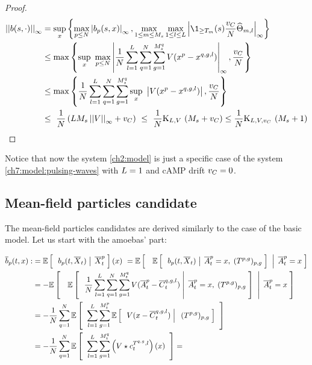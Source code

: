 \begin{proof}
	\begin{align*}
		\Norm{\drift(s,\cdot)}_\infty &=
		\sup_x 
		\left\{
			\max_{p\leq N}
			\norm{\drift_p(s,x)}_\infty,
			\max_{1 \leq m \leq \hmactive_s}
			\max_{1 \leq l \leq \NumCampRelease}
				\norm{\1_{\geq \btime_m}(s)  \frac{\cdrift}{N}  \cgonia_{m,l}}_\infty
		\right\}
		\\
		&\leq
		\max 
		\left\{
		\sup_x\
		\max_{p\leq N}
		\norm{
			\frac{1}{N} \sum _{l = 1}^{\NumCampRelease} \sum _{q = 1}^{N} \sum_{g = 1}^{\hmactive_s^q} \attraction(x^p - x^{q,g,l}) 
		}_\infty,
		\frac{\cdrift}{N}
		\right\}
		\\
		&\leq
		\max 
		\left\{
		\frac{1}{N} \sum _{l = 1}^{\NumCampRelease} \sum _{q = 1}^{N} \sum_{g = 1}^{\hmactive_s^q} 
		\sup_x\
		\abs{
			\attraction(x^p - x^{q,g,l})  
		},
		\frac{\cdrift}{N}
		\right\}\
		\\
		&\leq\
		\frac{1}{N}
		\left(
			\NumCampRelease \hmactive_s 
			\Norm{ \attraction }_\infty
			+
			\cdrift
		\right)\
		\leq\
		\frac{1}{N}
		\const_{\NumCampRelease, \attraction}\
		(\hmactive_s + \cdrift)
		\leq
			\frac{1}{N}
			\const_{\NumCampRelease, \attraction,\cdrift}\
			(\hmactive_s + 1)
	\end{align*}
\end{proof}

\begin{remark}
	Notice that now the system \ref{ch2:model} is just a specific case of the system \ref{ch7:model:pulsing-waves} with $L=1$ and cAMP drift $v_C=0$.
\end{remark}

\subsection{Mean-field particles candidate}

The mean-field particles candidates are derived similarly to the case of the basic model.
Let us start with the amoebas' part:

\begin{align*}
	\overline{b}_p(t, x) 
	:&= \mathbb{E} \left[ \; \left. \; b_p(t, \overline{X}_t) \; \right| \;  \overline{X}_t^p \; \right] (x)\
	= \mathbb{E} \left[ \; \left. \; \; 
		\mathbb{E} \left[ \; \left. \; 
			b_p(t, \overline{X}_t)		
		 \; \right| \; \overline{A}_t^p=x, \;(T^{p,g})_{p,g} \; \right]
		\; \; \right| \; \overline{A}_t^p=x \; \right]
	\\
	&= - \mathbb{E} \left[ \; \left. \; \; 
		\mathbb{E} \left[ \; \left. \; 
			\frac{1}{N} \sum _{l = 1}^{L} \sum _{q = 1}^{N} \sum_{g = 1}^{M_t^q} V(\overline{A}_t^p - \overline{C}_t^{q,g,l})
		 \; \right| \; \overline{A}_t^p=x, \;(T^{p,g})_{p,g} \; \right]
		\; \; \right| \; \overline{A}_t^p=x \; \right]
	\\
	&=
	- \frac{1}{N}
	\sum _{q = 1}^{N} 	
	 \mathbb{E} \left[ \; \; 
	 	 \sum _{l = 1}^{L} 
		\sum_{g = 1}^{M_t^p} 
		\mathbb{E} \left[ \; \left. \; 
			V(x - \overline{C}_t^{q,g,l}) 
		 \; \right| \; \;(T^{p,g})_{p,g} \; \right]
		\; \; \right]
	\\
	&= 
	- \frac{1}{N}
	\sum _{q = 1}^{N} 
	\mathbb{E} \left[ \; \; 
		 \sum _{l = 1}^{L} 
		\sum_{g = 1}^{M_t^q} 
		\left( V \star c_t^{T^{q,g},l} \right) (x)
		\; \; \right]
	=
\end{align*}

